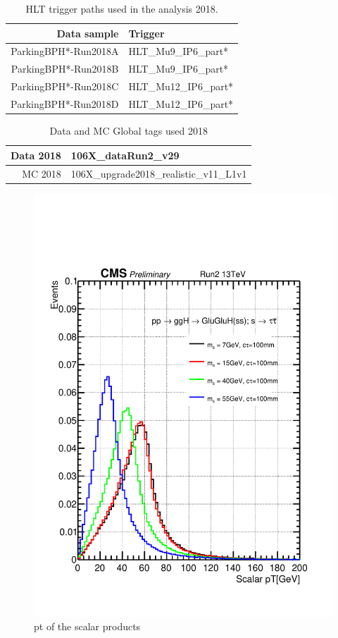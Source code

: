 \begin{table}[htb]
\caption{HLT trigger paths used in the analysis 2018.}
\begin{center}
\begin{tabular}{r|l}\hline
\hline
 Data sample & Trigger \\
\hline
 ParkingBPH*-Run2018A & HLT\_Mu9\_IP6\_part* \\
 ParkingBPH*-Run2018B & HLT\_Mu9\_IP6\_part* \\
 \hline
 ParkingBPH*-Run2018C & HLT\_Mu12\_IP6\_part* \\
 ParkingBPH*-Run2018D & HLT\_Mu12\_IP6\_part* \\
 \hline
 \hline
\end{tabular}
\label{tab:triggers18}
\end{center}
\end{table}

\begin{table}[htb]
\caption{Data and MC Global tags used 2018}
\begin{center}
\begin{tabular}{r|l}\hline
 Data 2018 & 106X\_dataRun2\_v29 \\
 \hline
 MC 2018   & 106X\_upgrade2018\_realistic\_v11\_L1v1 \\
 \hline
\end{tabular}
\label{tab:GT}
\end{center}
\end{table}



\begin{figure}[h!]
  \caption{pt of the scalar products}
  \label{fig:scalarpt}
  \centering
  \includegraphics[width=0.5\linewidth]{figs/Scalar_pT100mm.pdf}
\end{figure}

